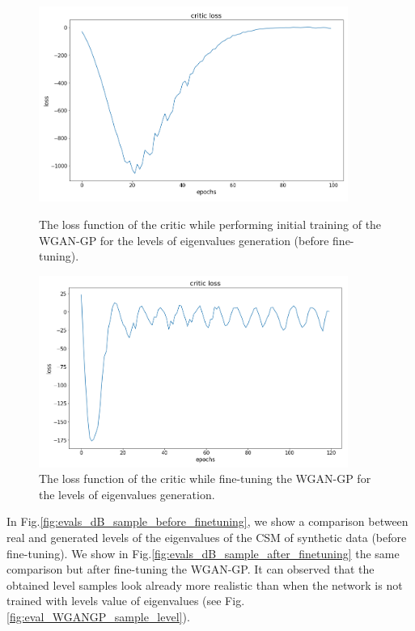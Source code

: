\documentclass{article}
\begin{document}
\begin{figure}
    \centering
    \begin{minipage}{0.45\textwidth}
        \includegraphics[width=0.9\textwidth]{../figs/evals_dB_loss_before_finetuning.png}    
    \caption{The loss function of the critic while performing initial training of the WGAN-GP for the levels of eigenvalues generation (before fine-tuning).}
    \label{fig:evals_dB_loss_before_finetuning}
    \end{minipage}\hfill
    \begin{minipage}{0.45\textwidth}
        \includegraphics[width=0.9\textwidth]{../figs/evals_dB_loss_after_finetuning.png}    
    \caption{The loss function of the critic while fine-tuning the WGAN-GP for the levels of eigenvalues generation.}
    \label{fig:evals_dB_loss_after_finetuning}
    \end{minipage}
\end{figure}





In Fig.\ref{fig:evals_dB_sample_before_finetuning}, we show a comparison between real and generated levels of the eigenvalues of the CSM of synthetic data (before fine-tuning). We show in Fig.\ref{fig:evals_dB_sample_after_finetuning} the same comparison but after fine-tuning the WGAN-GP. It can observed that the obtained level samples look already more realistic than when the network is not trained with levels value of eigenvalues (see Fig.\ref{fig:eval_WGANGP_sample_level}).
\end{document}
